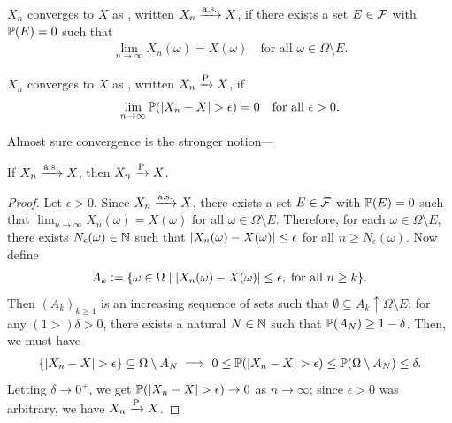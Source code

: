\begin{definition}
    $X_{n}$ converges to $X$ as , written $X_{n} \xrightarrow{\operatorname{a.s.}} X$, if there exists a set $E \in \mathcal{F}$ with $\mathbb{P}(E) = 0$ such that
    \begin{align}
        \lim_{n \to \infty} X_{n}(\omega) = X(\omega) \quad \text{for all } \omega \in \Omega \setminus E.
    \end{align}
\end{definition}

\begin{definition}
    $X_{n}$ converges to $X$ as , written $X_{n} \xrightarrow{\operatorname{P}} X$, if
    \begin{align}
        \lim_{n \to \infty} \mathbb{P}(\left| X_{n}-X \right| > \epsilon) = 0 \quad \text{for all } \epsilon > 0.
    \end{align}
\end{definition}
Almost sure convergence is the stronger notion---
\begin{proposition}
    If $X_{n} \xrightarrow{\operatorname{a.s.}} X$, then $X_{n} \xrightarrow{\operatorname{P}} X$.
\end{proposition}
\begin{proof}
    Let $\epsilon > 0$. Since $X_{n} \xrightarrow{\operatorname{a.s.}} X$, there exists a set $E \in \mathcal{F}$ with $\mathbb{P}(E) = 0$ such that $\lim_{n \to \infty} X_{n}(\omega) = X(\omega)$ for all $\omega \in \Omega \setminus E$. Therefore, for each $\omega \in \Omega \setminus E$, there exists $N_{\epsilon}(\omega) \in \mathbb{N}$ such that $\left| X_{n}(\omega)-X(\omega) \right| \leq \epsilon$ for all $n \geq N_{\epsilon}(\omega)$. Now define
    \begin{align}
        A_{k} \vcentcolon= \{\omega \in \Omega \mid \left| X_{n}(\omega)-X(\omega) \right| \leq \epsilon, \; \text{for all } n \geq k\}.
    \end{align}
    Then $(A_{k})_{k \geq 1}$ is an increasing sequence of sets such that $\emptyset \subseteq A_{k} \uparrow \Omega\setminus E$; for any $(1 > ) \delta > 0$, there exists a natural $N \in \mathbb{N}$ such that $\mathbb{P}(A_{N}) \geq 1-\delta$. Then, we must have
    \begin{align}
        \{\left| X_{n}-X \right| > \epsilon\} \subseteq \Omega \setminus A_{N} \implies 0 \leq \mathbb{P}(\left| X_{n}-X \right| > \epsilon) \leq \mathbb{P}(\Omega \setminus A_{N}) \leq \delta.
    \end{align}
    Letting $\delta \to 0^{+}$, we get $\mathbb{P}(\left| X_{n}-X \right| > \epsilon) \to 0$ as $n \to \infty$; since $\epsilon > 0$ was arbitrary, we have $X_{n} \xrightarrow{\operatorname{P}} X$.
\end{proof}

